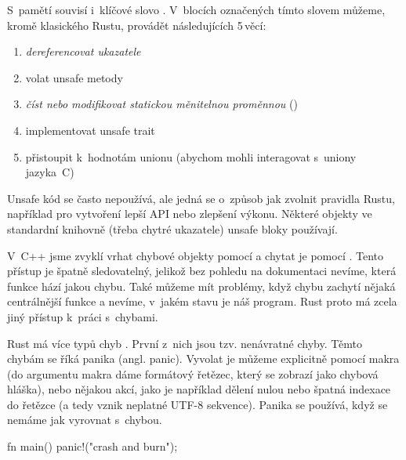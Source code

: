 \documentclass[main.tex]{subfiles}
\begin{document}

S~pamětí souvisí i~klíčové slovo . V~blocích označených tímto slovem můžeme,
kromě klasického  Rustu, provádět následujících 5\,věcí:
\begin{enumerate}
    \item \emph{dereferencovat ukazatele}
    \item volat unsafe metody
    \item \emph{číst nebo modifikovat statickou měnitelnou proměnnou} ()
    \item implementovat unsafe trait
    \item přistoupit k~hodnotám unionu (abychom mohli interagovat s~uniony jazyka~C)
\end{enumerate}

Unsafe kód se často nepoužívá, ale jedná se o~způsob jak zvolnit pravidla Rustu, například
pro vytvoření lepší API nebo zlepšení výkonu. Některé objekty ve standardní knihovně
(třeba chytré ukazatele) unsafe bloky používají. \cite[sekce\,19.1]{thebook}


V~C++ jsme zvyklí vrhat chybové objekty pomocí  a chytat je pomocí
. Tento přístup je špatně sledovatelný, jelikož bez pohledu na dokumentaci
nevíme, která funkce hází jakou chybu. Také můžeme mít problémy, když chybu zachytí nějaká
centrálnější funkce a nevíme, v~jakém stavu je náš program. Rust proto má zcela jiný
přístup k~práci s~chybami.


Rust má více typů chyb \cite[kapitola\,9]{thebook}. První z~nich jsou tzv. nenávratné
chyby. Těmto chybám se říká panika (angl. panic). Vyvolat je můžeme explicitně pomocí
makra  (do argumentu makra dáme formátový řetězec, který se zobrazí jako
chybová hláška), nebo nějakou akcí, jako je například dělení nulou nebo špatná indexace
do řetězce (a tedy vznik neplatné UTF-8 sekvence). \cite[sekce\,9.1]{thebook} Panika se
používá, když se nemáme jak vyrovnat s~chybou.

\obrazek
\begin{rustcode}
    fn main() {
        panic!("crash and burn");
    }
\end{rustcode}
\newline
{}
\end{document}
